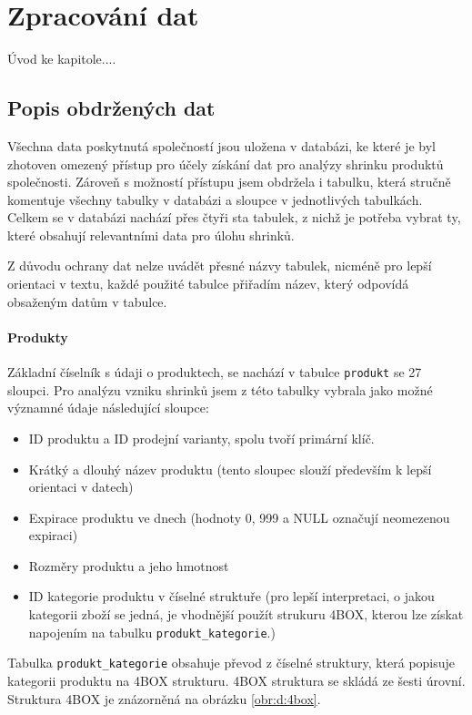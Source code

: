 \chapter{Zpracování dat}

Úvod ke kapitole.... %

\section{Popis obdržených dat}

Všechna data poskytnutá společností jsou uložena v databázi, ke které je byl zhotoven omezený přístup pro účely získání dat pro analýzy shrinku produktů společnosti. Zároveň s možností přístupu jsem obdržela i tabulku, která stručně komentuje všechny tabulky v databázi a sloupce v jednotlivých tabulkách. Celkem se v databázi nachází přes čtyři sta tabulek, z nichž je potřeba vybrat ty, které obsahují relevantními data pro úlohu shrinků.

Z důvodu ochrany dat nelze uvádět přesné názvy tabulek, nicméně pro lepší orientaci v textu, každé použité tabulce přiřadím název, který odpovídá obsaženým datům v tabulce.

\subsubsection{Produkty}

Základní číselník s údaji o produktech, se nachází v tabulce \texttt{produkt} se 27 sloupci. Pro analýzu vzniku shrinků jsem z této tabulky vybrala jako možné významné údaje následující sloupce:
\begin{itemize}
    \item ID produktu a ID prodejní varianty, spolu tvoří primární klíč. 
    \item Krátký a dlouhý název produktu (tento sloupec slouží především k lepší orientaci v datech)
    \item Expirace produktu ve dnech (hodnoty 0, 999 a NULL označují neomezenou expiraci)
    \item Rozměry produktu a jeho hmotnost
    \item ID kategorie produktu v číselné struktuře (pro lepší interpretaci, o jakou kategorii zboží se jedná, je vhodnější použít strukuru 4BOX, kterou lze získat napojením na tabulku \texttt{produkt\_kategorie}.)
\end{itemize}
Tabulka \texttt{produkt\_kategorie} obsahuje převod z číselné struktury, která popisuje kategorii produktu na 4BOX strukturu. 4BOX struktura se skládá ze šesti úrovní. Struktura 4BOX je znázorněná na obrázku \ref*{obr:d:4box}.

